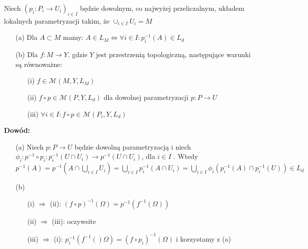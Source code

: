 \begin{tw}
	Niech $(p_i: P_i \rightarrow U_i)_{i \in I}$ będzie dowolnym, co najwyżej przeliczalnym, układem lokalnych parametryzacji takim, że $\cup_{i \in I} U_i = M$ 
	\begin{enumerate}
		\item[(a)] Dla $A \subset M$ mamy: $A \in L_M \Leftrightarrow \forall i \in I: p_i^{-1}(A) \in L_d$ 
		\item[(b)] Dla $f: M \rightarrow Y$. gdzie $Y$ jest przestrzenią topologiczną, następujące warunki są równoważne:
			\begin{enumerate}
				\item[(i)] $f \in \mathcal{M}(M, Y, L_M)$
				\item[(ii)] $f \circ p \in \mathcal{M}(P, Y, L_d)$ dla dowolnej parametryzacji $p: P \rightarrow U$
				\item[(iii)] $\forall i \in I: f \circ p \in \mathcal{M}(P_i, Y, L_d)$
			\end{enumerate}
	\end{enumerate}
	\textbf{Dowód:}
	\begin{enumerate}
		\item[(a)] Niech $p: P \rightarrow U$ będzie dowolną parametryzacją i niech $\phi_i: p^{-1} \circ p_i: p^{-1}_i(U \cap U_i) \rightarrow p^{-1}(U \cap U_i)$, dla $i \in I$  . Wtedy $p^{-1}(A) = p^{-1}(A \cap \bigcup_{i\in I} U_i) = \bigcup_{i \in I} p^{-1}_i(A \cap U_i) = \bigcup_{i \in I} \phi_i(p_i^{-1}(A) \cap p_i^{-1}(U)) \in L_d$ 
		\item[(b)]
			\begin{enumerate} 
				\item[(i)] $\Longrightarrow$ (ii): $(f \circ p)^{-1}(\Omega) = p^{-1}(f^{-1}(\Omega))$ 
				\item[(ii)] $\Longrightarrow$ (iii): oczywsite
				\item[(iii)] $\Longrightarrow$ (i): $p_i^{-1}(f^{-1}()\Omega) = (f \circ p_i)^{-1}(\Omega)$ i korzystamy z (a)
			\end{enumerate}
	\end{enumerate}
\end{tw}